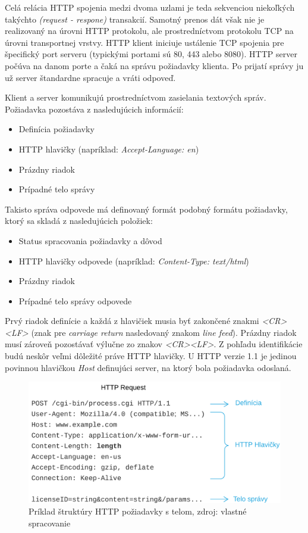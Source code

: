 \documentclass[
  digital, %
  table,   %
  lof,     %
  nolot,   %
  nocover
]{fithesis3}
\begin{document}
Celá relácia HTTP spojenia medzi dvoma uzlami je teda sekvenciou niekoľkých
takýchto \textit{(request - respone)} transakcií. Samotný prenos dát však nie
je realizovaný na úrovni HTTP protokolu, ale prostredníctvom protokolu TCP
na úrovni transportnej vrstvy. HTTP klient iniciuje ustálenie TCP spojenia pre
špecifický port serveru (typickými portami sú 80, 443 alebo 8080). HTTP server
počúva na danom porte a čaká na správu požiadavky klienta. Po prijatí správy ju
už server štandardne spracuje a vráti odpoveď. 

Klient a server komunikujú prostredníctvom zasielania textových správ.
Požiadavka pozostáva z nasledujúcich informácií: 
\begin{itemize}
	\item Definícia požiadavky
	\item HTTP hlavičky (napríklad: \textit{Accept-Language: en})
	\item Prázdny riadok
	\item Prípadné telo správy
\end{itemize}

Takisto správa odpovede má definovaný formát podobný formátu požiadavky, ktorý
sa skladá z nasledujúcich položiek:
\begin{itemize}
	\item Status spracovania požiadavky a dôvod
	\item HTTP hlavičky odpovede (napríklad: \textit{Content-Type: text/html})
	\item Prázdny riadok
	\item Prípadné telo správy odpovede
\end{itemize}

Prvý riadok definície a každá z hlavičiek musia byť zakončené znakmi
\textit{<CR><LF>}
(znak pre \textit{carriage return} nasledovaný znakom \textit{line feed}).
Prázdny riadok musí zároveň pozostávať výlučne zo znakov \textit{<CR><LF>}.
Z pohľadu identifikácie budú neskôr veľmi dôležité práve HTTP hlavičky. U HTTP
verzie 1.1 je jedinou povinnou hlavičkou \textit{Host} definujúci server, na
ktorý bola požiadavka odoslaná.

\begin{figure}[h]
  \centering
    \includegraphics[width=.97\textwidth]{images/net-http.png}
  \caption{Príklad štruktúry HTTP požiadavky s telom, zdroj: vlastné spracovanie}
  \label{fig:net-http}
\end{figure}
\end{document}
